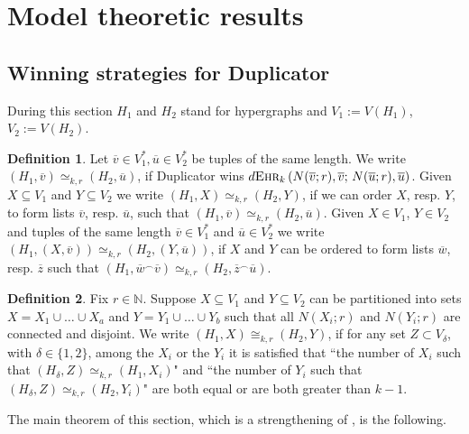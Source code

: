 \documentclass[12pt,notitlepage,a4paper]{article}
\theoremstyle{definition}
\newtheorem{definition}{Definition}[section]
\newcommand{\N}{\mathbb{N}}
\newcommand{\ehr}{\textsc{Ehr}}
\begin{document}
\section{Model theoretic results}

\subsection{Winning strategies for Duplicator}

During this section $H_1$ and $H_2$ stand for
hypergraphs and $V_1:=V(H_1)$, $V_2:=V(H_2)$.

\begin{definition} \label{def:similar}
Let $\overline{v} \in V_1^*, 
\overline{u} \in V_2^*$ be tuples of the same length.
We write $(H_1,\overline{v})\simeq_{k,r}(H_2, \overline{u})$, if Duplicator wins
$d\ehr_k\left(N(\overline{v};r),
\overline{v};\, N(\overline{u};r),\overline{u}\right)$.
Given $X\subseteq V_1$ and $Y\subseteq V_2$
we write $(H_1,X)\simeq_{k,r} (H_2,Y)$, if we can order $X$, resp. $Y$, to form
lists $\overline{v}$, resp. $\overline{u}$, such that 
$(H_1,\overline{v})\simeq_{k,r}(H_2,\overline{u})$. 
Given $X\in V_1$, $Y\in V_2$ and 
tuples of the same length $\overline{v}\in V_1^*$ and
$\overline{u}\in V_2^*$ we write
 $\left(H_1, (X,\overline{v})  \right)
\simeq_{k,r} \left(H_2, (Y,\overline{u})  \right)$, if
$X$ and $Y$ can be ordered to form lists
$\overline{w}$, resp. $\overline{z}$ such that
$(H_1,\overline{w}^\smallfrown \overline{v})
\simeq_{k,r} (H_2,\overline{z}^\smallfrown \overline{u})$. 
\end{definition}

\begin{definition} \label{def:analogous}
Fix $r\in \N$. Suppose $X\subseteq V_1$ and 
$Y\subseteq V_2$ can
be partitioned into sets $X=X_1\cup \dots \cup X_a$
and $Y=Y_1\cup \dots \cup Y_b$ 
such that all $N(X_i;r)$ and $N(Y_i;r)$
 are connected and disjoint. 
We write $(H_1,X)\cong_{k,r} (H_2,Y)$, 
if for any set $Z\subset V_\delta$, with $\delta\in \{1,2\}$,
among the $X_i$ or the $Y_i$
it is satisfied that ``the number of $X_i$  
such that $(H_\delta, Z) \simeq_{k,r} (H_1,X_i)$" 
and ``the number of $Y_i$ such that
$(H_\delta,Z)\simeq_{k,r} (H_2,Y_i)$"
are both equal or are both greater than $k-1$.
\end{definition}

The main theorem of this section, which
is a strengthening of \cite[Theorem 
2.6.7]{spencer2013strange}, is the following.
\end{document}
